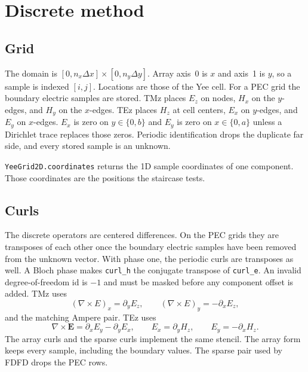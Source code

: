 \documentclass[11pt,a4paper]{article}
\begin{document}
\section{Discrete method}
\label{sec:method}

\subsection{Grid}
\label{sec:grid}

The domain is $[0,n_x\Delta x]\times[0,n_y\Delta y]$. Array axis~0 is $x$
and axis~1 is $y$, so a sample is indexed $[i,j]$. Locations are those of
the Yee cell. For a PEC grid the boundary electric samples are stored.
TMz places $E_z$ on nodes, $H_x$ on the $y$-edges, and $H_y$ on the
$x$-edges. TEz places $H_z$ at cell centers, $E_x$ on $y$-edges, and $E_y$
on $x$-edges. $E_x$ is zero on $y\in\{0,b\}$ and $E_y$ is zero on
$x\in\{0,a\}$ unless a Dirichlet trace replaces those zeros. Periodic
identification drops the duplicate far side, and every stored sample is an
unknown.

\texttt{YeeGrid2D.coordinates} returns the 1D sample coordinates of one
component. Those coordinates are the positions the staircase tests.

\subsection{Curls}
\label{sec:curls}

The discrete operators are centered differences. On the PEC grids they are
transposes of each other once the boundary electric samples have been
removed from the unknown vector. With phase one, the periodic curls are
transposes as well. A Bloch phase makes \texttt{curl\_h} the conjugate
transpose of \texttt{curl\_e}. An invalid degree-of-freedom id is $-1$
and must be masked before any component offset is added. TMz uses
\begin{equation}
(\nabla\times E)_x = \partial_y E_z,
\qquad
(\nabla\times E)_y = -\partial_x E_z,
\label{eq:curl-tm}
\end{equation}
and the matching Ampere pair. TEz uses
\begin{equation}
\nabla\times\mathbf{E}
= \partial_x E_y - \partial_y E_x,
\qquad
E_x = \partial_y H_z,
\qquad
E_y = -\partial_x H_z.
\label{eq:curl-te}
\end{equation}
The array curls and the sparse curls implement the same stencil.
The array form keeps every sample, including the boundary values. The
sparse pair used by FDFD drops the PEC rows.
\end{document}
